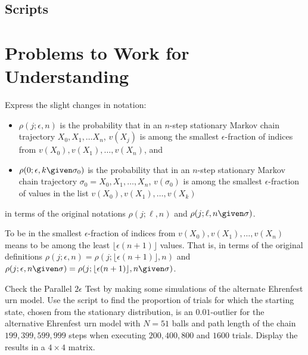 \documentclass[12pt]{article}
\begin{document}
\subsection*{Scripts}



\hr

\section*{Problems to Work for Understanding}
\renewcommand{\theexerciseseries}{}
\renewcommand{\theexercise}{\arabic{exercise}}

\begin{exercise}
    Express the slight changes in notation:
    \begin{itemize}
        \item
            \( \rho(j; \epsilon, n) \) is the probability that in an \(
            n \)-step stationary Markov chain trajectory \( X_0, X_1,
            \dots X_n \), \( v(X_j) \) is among the smallest \( \epsilon
            \)-fraction of indices from \( v(X_0), v(X_1), \dots, v(X_n)
            \), and
        \item
            \( \rho(0; \epsilon, k \given \sigma_0) \) is the
            probability that in an \( n \)-step stationary Markov chain
            trajectory \( \sigma_0 = X_0, X_1, \dots, X_n \), \( v(\sigma_0)
            \) is among the smallest \( \epsilon \)-fraction of values
            in the list \( v(X_0), v(X_1), \dots, v(X_k) \)
    \end{itemize}
    in terms of the original notations \( \rho(j; \ell, n) \) and \(
    \rho(j; \ell, n \given \sigma) \).
\end{exercise}
\begin{solution}
    To be in the smallest \( \epsilon \)-fraction of indices from \( v(X_0),
    v(X_1), \dots, v(X_n) \) means to be among the least \( \lfloor
    \epsilon (n+1) \rfloor \) values.  That is, in terms of the original
    definitions \( \rho(j; \epsilon, n) = \rho(j; \lfloor \epsilon (n+1)
    \rfloor, n) \) and \( \rho(j; \epsilon, n \given \sigma) = \rho(j;
    \lfloor \epsilon (n+1) \rfloor, n \given \sigma) \).

\end{solution}
\begin{exercise}
    Check the Parallel \( 2 \epsilon \) Test by making some simulations
    of the alternate Ehrenfest urn model.  Use the script to find the
    proportion of trials for which the starting state, chosen from the
    stationary distribution, is an \( 0.01 \)-outlier for the
    alternative Ehrenfest urn model with \( N = 51 \) balls and path
    length of the chain \( 199, 399, 599, 999 \) steps when executing \(
    200, 400, 800 \) and \( 1600 \) trials.  Display the results in a \(
    4 \times 4 \) matrix.
\end{exercise}
\end{document}
